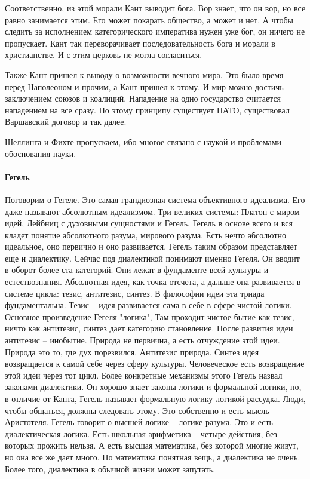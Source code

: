 \documentclass[a4paper, 12pt]{article}
\begin{document}
Соответственно, из этой морали Кант выводит бога. Вор знает, что он вор, но все равно занимается этим. Его может покарать общество, а может и нет. А чтобы следить за исполнением категорического императива нужен уже бог, он ничего не пропускает. Кант так переворачивает последовательность бога и морали в христианстве. И с этим церковь не могла согласиться. 

Также Кант пришел к выводу о возможности вечного мира. Это было время перед Наполеоном и прочим, а Кант пришел к этому. И мир можно достичь заключением союзов и коалиций. Нападение на одно государство считается нападением на все сразу. По этому принципу существует НАТО, существовал Варшавский договор и так далее. 

Шеллинга и Фихте пропускаем, ибо многое связано с наукой и проблемами обоснования науки. 

\paragraph{Гегель}
Поговорим о Гегеле. Это самая грандиозная система объективного идеализма. Его даже называют абсолютным идеализмом. Три великих системы: Платон с миром идей, Лейбниц с духовными сущностями и Гегель. Гегель в основе всего и вся кладет понятие абсолютного разума, мирового разума. Есть нечто абсолютно идеальное, оно первично и оно развивается. Гегель таким образом представляет еще и диалектику. Сейчас под диалектикой понимают именно Гегеля. Он вводит в оборот более ста категорий. Они лежат в фундаменте всей культуры и естествознания. Абсолютная идея, как точка отсчета, а дальше она развивается в системе цикла: тезис, антитезис, синтез. В философии идеи эта триада фундаментальна. Тезис -- идея развивается сама в себе в сфере чистой логики. Основное произведение Гегеля "логика"{}, Там проходит чистое бытие как тезис, ничто как антитезис, синтез дает категорию становление. После развития идеи антитезис -- инобытие. Природа не первична, а есть отчуждение этой идеи. Природа это то, где дух порезвился. Антитезис природа. Синтез идея возвращается к самой себе через сферу культуры. Человеческое есть возвращение этой идеи через тот цикл. Более конкретные механизмы этого Гегель назвал законами диалектики. Он хорошо знает законы логики и формальной логики, но, в отличие от Канта, Гегель называет формальную логику логикой рассудка. Люди, чтобы общаться, должны следовать этому. Это собственно и есть мысль Аристотеля. Гегель говорит о высшей логике -- логике разума. Это и есть диалектическая логика. Есть школьная арифметика -- четыре действия, без которых прожить нельзя. А есть высшая математика, без которой многие живут, но она все же дает много. Но математика понятная вещь, а диалектика не очень. Более того, диалектика в обычной жизни может запутать. 
\end{document}
